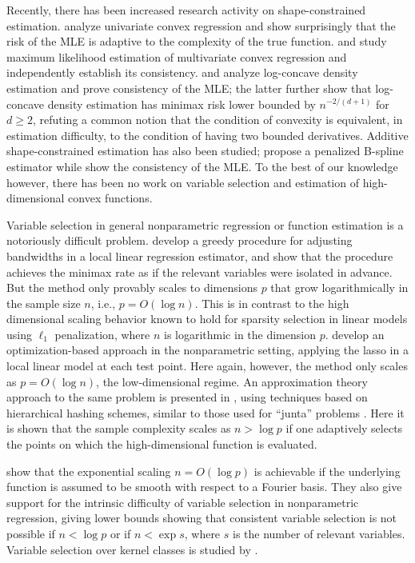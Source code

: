 Recently, there has been increased research activity on shape-constrained estimation. \cite{guntusen:13} analyze univariate convex regression and show surprisingly that the risk of the MLE is adaptive to the complexity of the true function. \cite{seijo2011nonparametric} and \cite{Lim:12} study maximum likelihood estimation of multivariate convex regression and independently establish its consistency. \cite{Cule:10} and \cite{kim2014global} analyze log-concave density estimation and prove consistency of the MLE; the latter further show that log-concave density estimation has minimax risk lower bounded by $n^{-2/(d+1)}$ for $d \geq 2$, refuting a common notion that the condition of convexity is equivalent, in estimation difficulty, to the condition of having two bounded derivatives. Additive shape-constrained estimation has also been studied; \cite{pya2014shape} propose a penalized B-spline estimator while \cite{chen2014generalised} show the consistency of the MLE. To the best of our knowledge however, there has been no work on variable selection and estimation of high-dimensional convex functions.


Variable selection in general nonparametric regression or function
estimation is a notoriously difficult problem. \citet{lafferty2008rodeo} develop a greedy procedure for
adjusting bandwidths in a local linear regression estimator,
and show that the procedure achieves the minimax rate
as if the relevant variables were isolated in advance.
But the method only provably scales to dimensions $p$ that 
grow logarithmically in the sample size $n$, i.e., $p = O(\log n)$.  This
is in contrast to the high dimensional scaling behavior
known to hold for sparsity selection in linear models
using $\ell_1$ penalization, where $n$
is logarithmic in the dimension $p$. \citet{bertin:08}
develop an optimization-based approach in
the nonparametric setting, applying the lasso
in a local linear model at each test point.  Here again,
however, the method only scales as $p = O(\log n)$,
the low-dimensional regime.
An approximation theory approach to the same
problem is presented in \cite{devore:11}, 
using techniques based on hierarchical hashing schemes,
similar to those used for ``junta'' problems \citep{mossel:04}.
Here it is shown that the sample complexity scales as $n > \log p$ 
if one adaptively selects the points on
which the high-dimensional function is evaluated.

\citet{dalalyan:12} show that the exponential scaling $n=O(\log p)$ is
achievable if the underlying function is assumed to be smooth with
respect to a Fourier basis. They also give support for the intrinsic
difficulty of variable selection in nonparametric regression, giving
lower bounds showing that consistent variable selection is not
possible if $n < \log p$ or if $n < \exp s$, where $s$ is the number
of relevant variables.  Variable selection over kernel classes is
studied by \citet{Kolch:10}.

